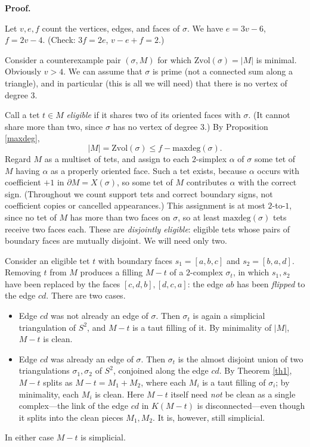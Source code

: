 \documentclass[12pt]{article}
\newcommand{\proofstart}{{\noindent \bf Proof.\ }}
\def\del{\partial}
\newcommand{\kw}{\mathrm}
\newcommand{\maxdeg}{\kw{maxdeg}}
\newcommand{\Zvol}{\kw{Zvol}}
\begin{document}
\proofstart

Let $v,e,f$  count the vertices, edges, and faces of $\sigma$.
We have
$e=3v-6$, $f=2v-4$.
(Check: $3f=2e$, $v-e+f=2$.)

Consider a counterexample pair $(\sigma,M)$ for which
$\Zvol(\sigma)=|M|$ is minimal.
Obviously $v>4$.
We can assume that $\sigma$ is prime
(not a connected sum along a triangle),
and in particular (this is all we will need) that there is no
vertex of degree $3$.

Call a tet $t \in M$ \emph{eligible} if it shares two of its oriented
faces with $\sigma$. (It cannot share more than two, since $\sigma$ has
no vertex of degree $3$.)
By Proposition \ref{maxdeg},
\[
|M| = \Zvol(\sigma) \leq f-\maxdeg(\sigma)
.
\]
Regard $M$ as a multiset of tets, and assign to each $2$-simplex
$\alpha$ of $\sigma$ some tet of $M$ having $\alpha$ as a properly
oriented face. Such a tet exists, because $\alpha$ occurs with
coefficient $+1$ in $\del M = X(\sigma)$, so some tet of $M$ contributes
$\alpha$ with the correct sign. (Throughout we count support tets and
correct boundary signs, not coefficient copies or cancelled appearances.)
This assignment is at most $2$-to-$1$, since no tet of $M$ has more than
two faces on $\sigma$, so at least $\maxdeg(\sigma)$ tets receive two
faces each. These are \emph{disjointly eligible}: eligible tets whose
pairs of boundary faces are mutually disjoint. We will need only two.

Consider an eligible tet $t$ with boundary faces $s_1=[a,b,c]$ and
$s_2=[b,a,d]$. Removing $t$ from $M$ produces a filling $M-t$ of a
$2$-complex $\sigma_t$, in which $s_1,s_2$ have been replaced by the
faces $[c,d,b],[d,c,a]$: the edge $ab$ has been \emph{flipped} to the
edge $cd$. There are two cases.
\begin{itemize}
\item[(1)] Edge $cd$ was not already an edge of $\sigma$. Then
$\sigma_t$ is again a simplicial triangulation of $S^2$, and $M-t$ is a
taut filling of it. By minimality of $|M|$, $M-t$ is clean.
\item[(2)] Edge $cd$ was already an edge of $\sigma$. Then $\sigma_t$
is the almost disjoint union of two triangulations $\sigma_1,\sigma_2$
of $S^2$, conjoined along the edge $cd$. By Theorem \ref{th1}, $M-t$
splits as $M-t=M_1+M_2$, where each $M_i$ is a taut filling of
$\sigma_i$; by minimality, each $M_i$ is clean. Here $M-t$ itself need
\emph{not} be clean as a single complex---the link of the edge $cd$ in
$K(M-t)$ is disconnected---even though it splits into the clean pieces
$M_1,M_2$. It is, however, still simplicial.
\end{itemize}
In either case $M-t$ is simplicial.
\end{document}
